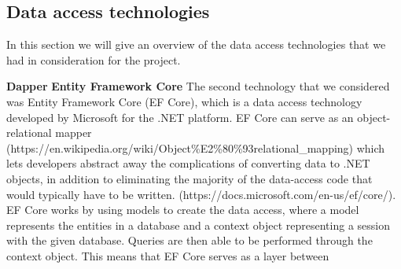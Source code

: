 \subsection{Data access technologies}
In this section we will give an overview of the data access technologies that we had in consideration for the project.


\textbf{Dapper}
\textbf{Entity Framework Core}
The second technology that we considered was Entity Framework Core (EF Core), which is a data access technology developed by Microsoft for the .NET platform. EF Core can serve as an object-relational mapper (https://en.wikipedia.org/wiki/Object\%E2\%80\%93relational_mapping) which lets developers abstract away the complications of converting data to .NET objects, in addition to eliminating the majority of the data-access code that would typically have to be written. (https://docs.microsoft.com/en-us/ef/core/).
EF Core works by using models to create the data access, where a model represents the entities in a database and a context object representing a session with the given database. Queries are then able to be performed through the context object. 
This means that EF Core serves as a layer between 



